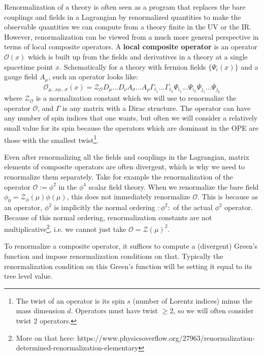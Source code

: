 \documentclass[11pt, oneside]{article}   	%
\theoremstyle{definition}
\begin{document}
Renormalization of a theory is often seen as a program that replaces the bare couplings and fields in a Lagrangian by 
renormalized quantities to make the observable quantities we can compute from a theory finite in the UV or the IR. 
However, renormalization can be viewed from a much more general perspective in terms of local composite operators. 
A \textbf{local composite operator} is an operator $\mathcal O(x)$ which is built up from the fields and derivatives in a theory 
at a single spacetime point $x$. Schematically for a theory with fermion fields $\{\Psi_i(x)\}$ and a gauge field $A_\mu$, 
such an operator looks like:
\begin{equation}
	\mathcal O_{\mu ...\nu \rho ... \sigma}(x) = \mathcal Z_{\mathcal O} D_{\mu}...D_{\nu} A_{\sigma} ... A_{\rho} 
	\Gamma_{\ell_1} ... \Gamma_{\ell_k} \Psi_{i_1} ... \Psi_{i_k} \overline \Psi_{j_1} ... \overline\Psi_{j_k}
\end{equation}
where $\mathcal Z_{\mathcal O}$ is a normalization constant which we will use to renormalize the operator $\mathcal O$, 
and $\Gamma$ is any matrix with a Dirac structure. The operator can have any number of spin indices that one wants, but 
often we will consider a relatively small value for its spin because the operators which are dominant in the OPE 
are those with the smallest twist\footnote{The twist of an operator is its spin $s$ (number of Lorentz indices) minus the mass 
dimension $d$. Operators must have twist $\geq 2$, so we will often consider twist 2 operators.}. 

Even after renormalizing all the fields and couplings in the Lagrangian, matrix elements of composite operators are often 
divergent, which is why we need to renormalize them separately. Take for example the renormalization of the operator 
$\mathcal O := \phi^2$ in the $\phi^4$ scalar field theory. When we renormalize the bare field $\phi_0 = \mathcal Z_\phi(\mu)
\phi(\mu)$, this does not immediately renormalize $\mathcal O$. This is because as an operator, $\phi^2$ is implicitly the 
normal ordering $:\phi^2:$ of the actual $\phi^2$ operator. Because of this normal ordering, renormalization constants 
are not multiplicative\footnote{More on that here: https://www.physicsoverflow.org/27963/renormalization-determined-renormalization-elementary}, i.e. we cannot just take $\mathcal O = \mathcal Z(\mu)^2$. 

To renormalize a composite operator, it suffices to compute a (divergent) Green's function and impose renormalization 
conditions on that. Typically the renormalization condition on this Green's function will be setting it equal to its 
tree level value. 
\end{document}
